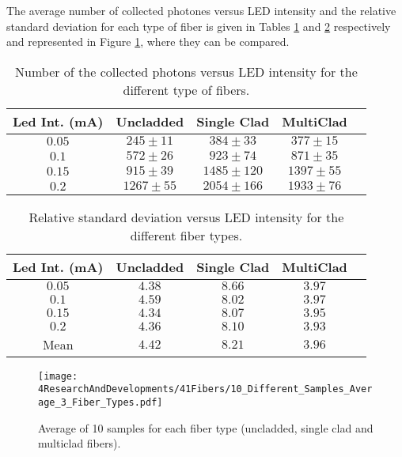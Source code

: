 The average number of collected photones versus LED intensity and the relative standard deviation for each type of fiber is given in Tables \ref{tab:10DifferentSamples} and \ref{tab:RelativeStandardDeviation3FiberTypes} respectively and represented in Figure \ref{fig:AveregeThreeFiberTypes}, where they can be compared. 

\begin{table}[h]
\begin{center}
\begin{tabular}{|c|c|c|c|c|}
\hline
Led Int. (mA) & Uncladded & Single Clad & MultiClad\\
\hline \hline \hline
$0.05$ & $245 \pm 11$ & $384 \pm 33$ & $377 \pm 15$ \\ \hline
$0.1$ & $572 \pm 26$ & $923 \pm 74$ & $871 \pm 35$ \\ \hline
$0.15$ & $915 \pm 39$ & $1485 \pm 120$ & $1397 \pm 55$ \\ \hline
$0.2$ & $1267 \pm 55$ & $2054 \pm 166$ & $1933 \pm 76$ \\ \hline
\end{tabular}
\caption{Number of the collected photons versus LED intensity for the different type of fibers.}
\label{tab:10DifferentSamples}
\end{center}
\end{table}

\begin{table}[h]
\begin{center}
\begin{tabular}{|c|c|c|c|c|}
\hline
Led Int. (mA) & Uncladded & Single Clad & MultiClad \\
\hline \hline \hline
$0.05$ & $4.38$ & $8.66$ & $3.97$ \\ \hline
$0.1$ & $4.59$ & $8.02$ & $3.97$ \\ \hline
$0.15$ & $4.34$ & $8.07$ & $3.95$ \\ \hline
$0.2$ & $4.36$ & $8.10$ & $3.93$ \\ \hline
Mean & $4.42$ & $8.21$ & $3.96$ \\ \hline
\end{tabular}
\caption{Relative standard deviation versus LED intensity for the different fiber types.}
\label{tab:RelativeStandardDeviation3FiberTypes}
\end{center}
\end{table}

\begin{figure}[h]
\centering
\texttt{[image: 4ResearchAndDevelopments/41Fibers/10\_Different\_Samples\_Average\_3\_Fiber\_Types.pdf]}
\caption{Average of 10 samples for each fiber type (uncladded, single clad and multiclad fibers).\label{fig:AveregeThreeFiberTypes}}
\end{figure}

